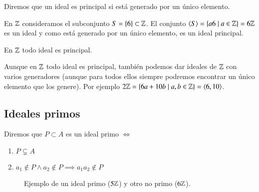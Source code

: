 \begin{dfn}
	Diremos que un ideal es principal si está generado por un único elemento.
\end{dfn}

\begin{ej}
	En $\mathbb{Z}$ consideramos el subconjunto $S = \{6\} \subset \mathbb{Z}$. El conjunto $\langle S\rangle = \{a6 \mid a \in \mathbb{Z}\} = 6\mathbb{Z}$ es un ideal y como está generado por un único elemento, es un ideal principal.
\end{ej}

\begin{obs}
	En $\mathbb{Z}$ todo ideal es principal.
\end{obs}

\begin{ej}
	Aunque en $\mathbb{Z}$ todo ideal es principal, también podemos dar ideales de $\mathbb{Z}$ con varios generadores (aunque para todos ellos siempre podremos encontrar un único elemento que los genere). Por ejemplo $2\mathbb{Z} = \{6a+10b \mid a,b \in \mathbb{Z}\} = \langle6,10\rangle$.
\end{ej}

\subsection{Ideales primos}

\begin{dfn}
	Diremos que $P \subset A$ es un ideal primo $\iff$
	\begin{enumerate}
		\item $P \subsetneq A$
		\item $a_1 \notin P \land a_2 \notin P \implies a_1 a_2 \notin P$
	\end{enumerate}
\end{dfn}

\begin{figure}[h]
	\centering
	\caption{Ejemplo de un ideal primo ($5\mathbb{Z}$) y otro no primo ($6\mathbb{Z}$).}
\end{figure}

